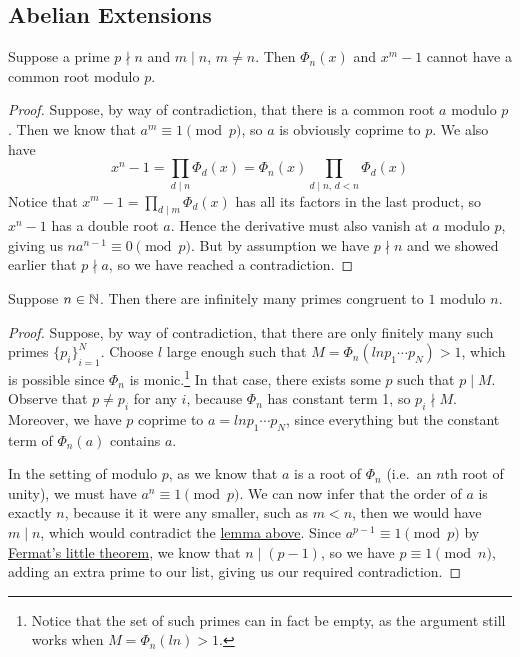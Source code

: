 \subsection*{Abelian Extensions}

\begin{lemma}\label{lem:common-root-mod-p}
    Suppose a prime \(p \nmid n\) and \(m \mid n\), \(m \neq n\).
    Then \(\Phi_n(x)\) and \(x^m - 1\) cannot have a common root modulo \(p\).
\end{lemma}
\begin{proof}
    Suppose, by way of contradiction, that there is a common root \(a\) modulo \(p\).
    Then we know that \(a^m \equiv 1 \pmod{p}\), so \(a\) is obviously coprime to \(p\).
    We also have
    \begin{equation*}
        x^n - 1 = \prod_{d \mid n} \Phi_d(x) = \Phi_n(x) \prod_{d \mid n,\, d < n} \Phi_d(x)
    \end{equation*}
    Notice that \(x^m - 1 = \prod_{d \mid m} \Phi_d(x)\) has all its factors in the last product,
    so \(x^n - 1\) has a double root \(a\).
    Hence the derivative must also vanish at \(a\) modulo \(p\),
    giving us \(na^{n-1} \equiv 0 \pmod{p}\).
    But by assumption we have \(p \nmid n\) and we showed earlier that \(p \nmid a\),
    so we have reached a contradiction.
\end{proof}
\begin{theorem}\label{thm:prime-1-mod-n}
    Suppose \(n \in \mathbb{N}\).
    Then there are infinitely many primes congruent to \(1\) modulo \(n\).
\end{theorem}
\begin{proof}
    Suppose, by way of contradiction, that there are only finitely many such primes \({\{p_i\}}_{i=1}^N\).
    Choose \(l\) large enough such that \(M = \Phi_n(l np_1 \cdots p_N) > 1\),
    which is possible since \(\Phi_n\) is monic.\footnote{%
        Notice that the set of such primes can in fact be empty,
        as the argument still works when \(M = \Phi_n(l n) > 1\).
    }
    In that case, there exists some \(p\) such that \(p \mid M\).
    Observe that \(p \neq p_i\) for any \(i\),
    because \(\Phi_n\) has constant term 1, so \(p_i \nmid M\).
    Moreover, we have \(p\) coprime to \(a = l np_1 \cdots p_N\),
    since everything but the constant term of \(\Phi_n(a)\) contains \(a\).

    In the setting of modulo \(p\), as we know that \(a\) is a root of \(\Phi_n\) (i.e.\ an \(n\)th root of unity),
    we must have \(a^n \equiv 1 \pmod{p}\).
    We can now infer that the order of \(a\) is exactly \(n\),
    because it it were any smaller, such as \(m < n\), then we would have \(m \mid n\),
    which would contradict the \hyperref[lem:common-root-mod-p]{lemma above}.
    Since \(a^{p-1} \equiv 1 \pmod{p}\) by \hyperref[thm:fermat-little]{Fermat's little theorem},
    we know that \(n \mid (p-1)\), so we have \(p \equiv 1 \pmod{n}\),
    adding an extra prime to our list, giving us our required contradiction.
\end{proof}

